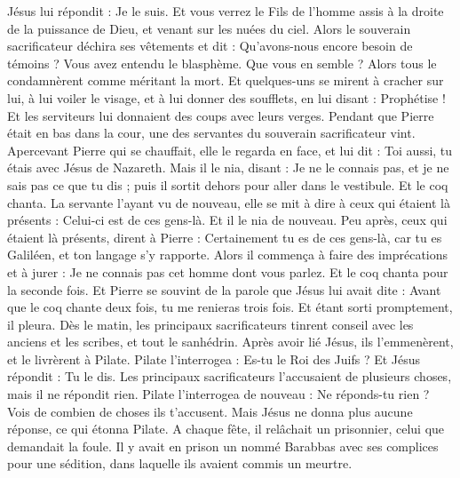 \begin{multicols}{2}
Jésus lui répondit : Je le suis. Et vous verrez le Fils de l'homme assis à la droite de la puissance de Dieu, et venant sur les nuées du ciel.
Alors le souverain sacrificateur déchira ses vêtements et dit : Qu'avons-nous encore besoin de témoins ?
Vous avez entendu le blasphème. Que vous en semble ? Alors tous le condamnèrent comme méritant la mort.
Et quelques-uns se mirent à cracher sur lui, à lui voiler le visage, et à lui donner des soufflets, en lui disant : Prophétise ! Et les serviteurs lui donnaient des coups avec leurs verges.
Pendant que Pierre était en bas dans la cour, une des servantes du souverain sacrificateur vint.
Apercevant Pierre qui se chauffait, elle le regarda en face, et lui dit : Toi aussi, tu étais avec Jésus de Nazareth.
Mais il le nia, disant : Je ne le connais pas, et je ne sais pas ce que tu dis ; puis il sortit dehors pour aller dans le vestibule. Et le coq chanta.
La servante l'ayant vu de nouveau, elle se mit à dire à ceux qui étaient là présents : Celui-ci est de ces gens-là. Et il le nia de nouveau.
Peu après, ceux qui étaient là présents, dirent à Pierre : Certainement tu es de ces gens-là, car tu es Galiléen, et ton langage s'y rapporte.
Alors il commença à faire des imprécations et à jurer : Je ne connais pas cet homme dont vous parlez.
Et le coq chanta pour la seconde fois. Et Pierre se souvint de la parole que Jésus lui avait dite : Avant que le coq chante deux fois, tu me renieras trois fois. Et étant sorti promptement, il pleura.
\VerseOne{}Dès le matin, les principaux sacrificateurs tinrent conseil avec les anciens et les scribes, et tout le sanhédrin. Après avoir lié Jésus, ils l'emmenèrent, et le livrèrent à Pilate.
Pilate l'interrogea : Es-tu le Roi des Juifs ? Et Jésus répondit : Tu le dis.
Les principaux sacrificateurs l'accusaient de plusieurs choses, mais il ne répondit rien.
Pilate l'interrogea de nouveau : Ne réponds-tu rien ? Vois de combien de choses ils t’accusent.
Mais Jésus ne donna plus aucune réponse, ce qui étonna Pilate.
A chaque fête, il relâchait un prisonnier, celui que demandait la foule.
Il y avait en prison un nommé Barabbas avec ses complices pour une sédition, dans laquelle ils avaient commis un meurtre.

\end{multicols}
